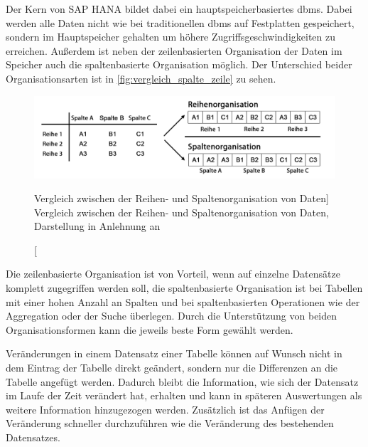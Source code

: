 \begin{onehalfspacing}
Der Kern von SAP HANA bildet dabei ein hauptspeicherbasiertes \gls{dbms}. Dabei werden alle Daten nicht wie bei traditionellen \gls{dbms} auf Festplatten gespeichert, sondern im Hauptspeicher gehalten um höhere Zugriffsgeschwindigkeiten zu erreichen. Außerdem ist neben der zeilenbasierten Organisation der Daten im Speicher auch die spaltenbasierte Organisation möglich. Der Unterschied beider Organisationsarten ist in \vref{fig:vergleich_spalte_zeile} zu sehen. 

\begin{figure}[!ht]
\centering
\setlength{\unitlength}{1mm}
\includegraphics[width=15cm]{images/in-memory-row-column.pdf}
\caption
[Vergleich zwischen der Reihen- und Spaltenorganisation von Daten]
{Vergleich zwischen der Reihen- und Spaltenorganisation von Daten, Darstellung in Anlehnung an  \label{fig:vergleich_spalte_zeile}}
\end{figure}

Die zeilenbasierte Organisation ist von Vorteil, wenn auf einzelne Datensätze komplett zugegriffen werden soll, die spaltenbasierte Organisation ist bei Tabellen mit einer hohen Anzahl an Spalten und bei spaltenbasierten Operationen wie der Aggregation oder der Suche überlegen. Durch die Unterstützung von beiden Organisationsformen kann die jeweils beste Form gewählt werden.

Veränderungen in einem Datensatz einer Tabelle können auf Wunsch nicht in dem Eintrag der Tabelle direkt geändert, sondern nur die Differenzen an die Tabelle angefügt werden. Dadurch bleibt die Information, wie sich der Datensatz im Laufe der Zeit verändert hat, erhalten und kann in späteren Auswertungen als weitere Information hinzugezogen werden. Zusätzlich ist das Anfügen der Veränderung schneller durchzuführen wie die Veränderung des bestehenden Datensatzes.


\end{onehalfspacing}
